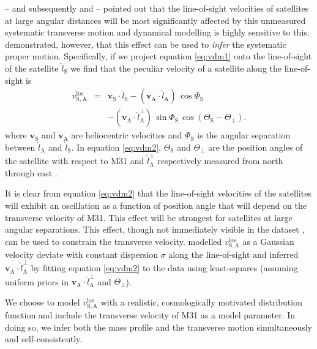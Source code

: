 \documentclass[preprint]{aastex}
\newcommand{\eqlabel}[1]{\label{eq:#1}}
\newcommand{\eq}[1]{equation \ref{eq:#1}}
\begin{document}
\citet{Bahcall:1981} -- and subsequently \citet{ew} and \citet{vdm} -- pointed
out that the line-of-sight velocities of satellites at large angular distances
will be most significantly affected by this unmeasured systematic transverse
motion and dynamical modelling is highly sensitive to this.  \citet{vdm}
demonstrated, however, that this effect can be used to \emph{infer} the
systematic proper motion.  Specifically, if we project \eq{vdm1}
onto the line-of-sight of the satellite $\hat{l}_\mathrm{S}$ we find that the
peculiar velocity of a satellite along the line-of-sight is
\begin{eqnarray}
    \eqlabel{vdm2}
    v_\mathrm{S,A}^\mathrm{los} & =& \mathbf{v}_{\mathrm{S}}
    \cdot \hat{l}_\mathrm{S} - (\mathbf{v}_{\mathrm{A}}
    \cdot \hat{l}_\mathrm{A}) \, \cos \Phi_\mathrm{S} \nonumber \\ &&
    - (\mathbf{v}_{\mathrm{A}} \cdot \hat{l}_\mathrm{A}^\perp) \,
    \sin \Phi_\mathrm{S} \, \cos \left ( \Theta_\mathrm{S} - \Theta_\perp \right ).
\end{eqnarray}
where $\mathbf{v}_{\mathrm{S}}$ and $\mathbf{v}_{\mathrm{A}}$ are heliocentric
velocities and $\Phi_\mathrm{S}$ is the angular separation between
$\hat{l}_\mathrm{A}$ and $\hat{l}_\mathrm{S}$.  In \eq{vdm2},
$\Theta_\mathrm{S}$ and $\Theta_\perp$ are the position angles of the satellite
with respect to M31 and $\hat{l}_\mathrm{A}^\perp$ respectively measured from
north through east \citep[][their equation 3]{vdm}.

It is clear from \eq{vdm2} that the line-of-sight velocities of
the satellites will exhibit an oscillation as a function of position angle that
will depend on the transverse velocity of M31.  This effect will be strongest
for satellites at large angular separations.  This effect, though not immediately
visible in the dataset \citep[e.g.~figure 1 of][]{vdm}, can be used to constrain
the transverse velocity.  \citet{vdm} modelled $v_\mathrm{S,A}^\mathrm{los}$ as
a Gaussian velocity deviate with constant dispersion $\sigma$ along the line-of-sight
and inferred $\mathbf{v}_{\mathrm{A}} \cdot \hat{l}_\mathrm{A}^\perp$ by fitting
\eq{vdm2} to the data using least-squares (assuming uniform priors
in $\mathbf{v}_{\mathrm{A}} \cdot \hat{l}_\mathrm{A}^\perp$ and $\Theta_\perp$).

We choose to model $v_\mathrm{S,A}^\mathrm{los}$ with a realistic, cosmologically
motivated distribution function and include the transverse velocity of M31 as
a model parameter.  In doing so, we infer both the mass profile and the
transverse motion simultaneously and self-consistently.
\end{document}
